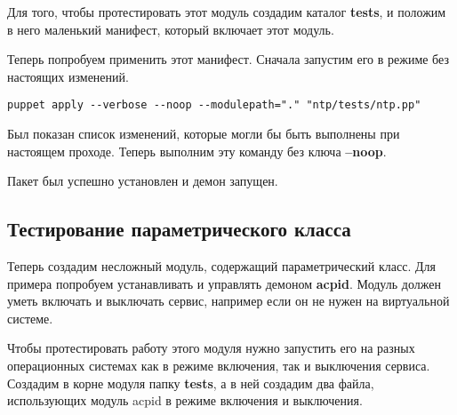 

Для того, чтобы протестировать этот модуль создадим каталог \textbf{tests}, и положим в него маленький манифест, который включает этот модуль.




Теперь попробуем применить этот манифест. Сначала запустим его в режиме без настоящих изменений.

\begin{verbatim}
puppet apply --verbose --noop --modulepath="." "ntp/tests/ntp.pp"
\end{verbatim}


Был показан список изменений, которые могли бы быть выполнены при настоящем проходе. Теперь выполним эту команду без ключа \textbf{--noop}.


Пакет был успешно установлен и демон запущен.

\subsection{Тестирование параметрического класса}

Теперь создадим несложный модуль, содержащий параметрический класс. Для примера попробуем устанавливать и управлять демоном \textbf{acpid}. Модуль должен уметь включать и выключать сервис, например если он не нужен на виртуальной системе.



Чтобы протестировать работу этого модуля нужно запустить его на разных операционных системах как в режиме включения, так и выключения сервиса. Создадим в корне модуля папку \textbf{tests}, а в ней создадим два файла, использующих модуль acpid в режиме включения и выключения.





